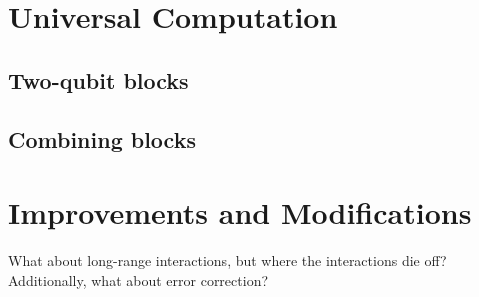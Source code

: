 \documentclass[../thesis-main/thesis-main]{subfiles}
\begin{document}
% 
%






\section{Universal Computation}
\subsection{Two-qubit blocks}
\subsection{Combining blocks}


\section{Improvements and Modifications}

What about long-range interactions, but where the interactions die off?
Additionally, what about error correction?
\end{document}
